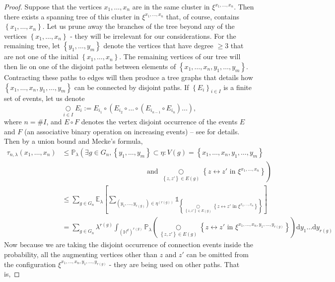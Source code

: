 \documentclass[10pt,a4paper,dvipsnames]{article}
\theoremstyle{definition}
\theoremstyle{remark}
\newcommand{\pla}{\mathbb P_\lambda}
\newcommand{\ela}{\mathbb E_{\lambda}}
\newcommand{\HypDim}{{\mathbb{H}^d}}
\newcommand{\dd}{\mathrm{d}} %
\newcommand{\conn}[3]{#1 \longleftrightarrow #2\textrm { in } #3}
\newcommand{\Id}{\mathds 1}
\numberwithin{equation}{section}
\begin{document}
\begin{proof}
    Suppose that the vertices $x_1,\ldots,x_n$ are in the same cluster in $\xi^{x_1,\ldots,x_n}$. Then there exists a spanning tree of this cluster in $\xi^{x_1,\ldots,x_n}$ that, of course, contains $\left\{x_1,\ldots,x_n\right\}$. Let us prune away the branches of the tree beyond any of the vertices $\left\{x_1,\ldots,x_n\right\}$ - they will be irrelevant for our considerations. For the remaining tree, let $\left\{y_1,\ldots,y_m\right\}$ denote the vertices that have degree $\geq 3$ that are not one of the initial $\left\{x_1,\ldots,x_n\right\}$. The remaining vertices of our tree will then lie on one of the disjoint paths between elements of $\left\{x_1,\ldots,x_n,y_1,\ldots,y_m\right\}$. Contracting these paths to edges will then produce a tree graphs that details how $\left\{x_1,\ldots,x_n,y_1,\ldots,y_m\right\}$ can be connected by disjoint paths. If $\left\{E_i\right\}_{i\in I}$ is a finite set of events, let us denote
    \begin{equation}
        \underset{i\in I}{\bigcirc}E_i := E_{i_1}\circ\left( E_{i_2}\circ\ldots\circ \left(E_{i_{n-1}}\circ E_{i_n}\right)\ldots\right),
    \end{equation}
    where $n=\# I$, and $E\circ F$ denotes the vertex disjoint occurrence of the events $E$ and $F$ (an associative binary operation on increasing events) -- see \cite[Section~2.3]{HeyHofLasMat19} for details. Then by a union bound and Mecke's formula,    
\begin{align}
    \tau_{n,\lambda}\left(x_1,\ldots,x_n\right) &\leq \pla\left(\exists g\in G_n, \left\{y_1,\ldots,y_m\right\}\subset \eta\colon V(g)=\left\{x_1,\ldots,x_n,y_1,\ldots,y_m\right\} \right.\nonumber\\
    &\hspace{5cm}\left.\text{ and } \underset{\left\{z,z'\right\}\in E(g)}{\bigcirc}\left\{\conn{z}{z'}{\xi^{x_1,\ldots,x_n}}\right\}\right)\nonumber\\
    &\leq \sum_{g\in G_n}\ela\left[\sum_{\left(y_1,\ldots,y_{r(g)}\right)\in\eta^{\left(r(g)\right)}}\Id_{\left\{\underset{\left\{z,z'\right\}\in E(g)}{\bigcirc}\left\{\conn{z}{z'}{\xi^{x_1,\ldots,x_n}}\right\}\right\}}\right]\nonumber\\
    & = \sum_{g\in G_n}\lambda^{r(g)}\int_{\left(\HypDim\right)^{r(g)}} \pla\left(\underset{\left\{z,z'\right\}\in E(g)}{\bigcirc}\left\{\conn{z}{z'}{\xi^{x_1,\ldots,x_n,y_1,\ldots,y_{r(g)}}}\right\}\right) \dd y_1\ldots \dd y_{r(g)}
\end{align}
Now because we are taking the disjoint occurrence of connection events inside the probability, all the augmenting vertices other than $z$ and $z'$ can be omitted from the configuration $\xi^{x_1,\ldots,x_n,y_1,\ldots,y_{r(g)}}$ - they are being used on other paths. That is,

\end{proof}
\end{document}
